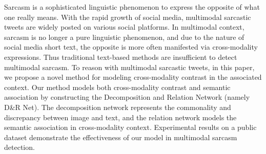 Sarcasm is a sophisticated linguistic phenomenon to express the opposite of what one really means. With the rapid growth of social media, multimodal sarcastic tweets are widely posted on various social platforms. In multimodal context, sarcasm is no longer a pure linguistic phenomenon, and due to the nature of social media short text, the opposite is more often manifested via cross-modality expressions. Thus traditional text-based methods are insufficient to detect multimodal sarcasm. To reason with multimodal sarcastic tweets, in this paper, we propose a novel method for modeling cross-modality contrast in the associated context. Our method models both cross-modality contrast and semantic association by constructing the Decomposition and Relation Network (namely D\&R Net). The decomposition network represents the commonality and discrepancy between image and text, and the relation network models the semantic association in cross-modality context. Experimental results on a public dataset demonstrate the effectiveness of our model in multimodal sarcasm detection.
